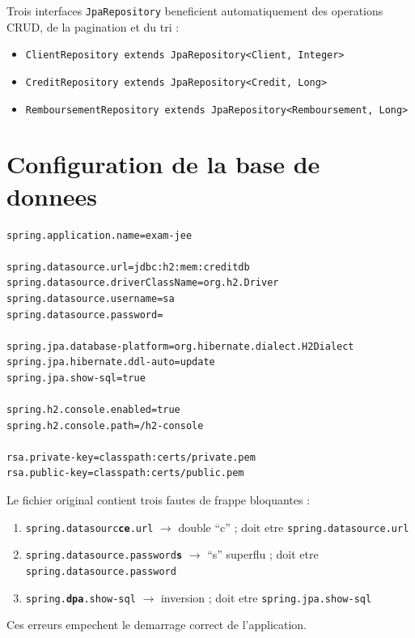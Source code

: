 \documentclass[12pt,a4paper]{report}
\newcommand{\ERR}{\textcolor{red}{$\times$}}
\begin{document}
Trois interfaces \texttt{JpaRepository} beneficient automatiquement des
operations CRUD, de la pagination et du tri :

\begin{itemize}
    \item \texttt{ClientRepository extends JpaRepository<Client, Integer>}
    \item \texttt{CreditRepository extends JpaRepository<Credit, Long>}
    \item \texttt{RemboursementRepository extends JpaRepository<Remboursement, Long>}
\end{itemize}

\section{Configuration de la base de donnees}

\begin{lstlisting}[style=propertiesStyle, caption={application.properties (version corrigee)}]
spring.application.name=exam-jee

spring.datasource.url=jdbc:h2:mem:creditdb
spring.datasource.driverClassName=org.h2.Driver
spring.datasource.username=sa
spring.datasource.password=

spring.jpa.database-platform=org.hibernate.dialect.H2Dialect
spring.jpa.hibernate.ddl-auto=update
spring.jpa.show-sql=true

spring.h2.console.enabled=true
spring.h2.console.path=/h2-console

rsa.private-key=classpath:certs/private.pem
rsa.public-key=classpath:certs/public.pem
\end{lstlisting}

\begin{tcolorbox}[colback=red!8, colframe=red!70,
                  title={\ERR\ Anomalies detectees dans application.properties}]
Le fichier original contient trois fautes de frappe bloquantes :
\begin{enumerate}
    \item \texttt{spring.datasourc\textbf{ce}.url}
          $\rightarrow$ double ``c'' ; doit etre \texttt{spring.datasource.url}
    \item \texttt{spring.datasource.password\textbf{s}}
          $\rightarrow$ ``s'' superflu ; doit etre \texttt{spring.datasource.password}
    \item \texttt{spring.\textbf{dpa}.show-sql}
          $\rightarrow$ inversion ; doit etre \texttt{spring.jpa.show-sql}
\end{enumerate}
Ces erreurs empechent le demarrage correct de l'application.
\end{tcolorbox}
\end{document}
